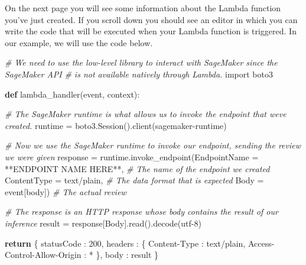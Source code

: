 \documentclass[11pt]{article}
\newenvironment{Shaded}{}{}
\newcommand{\KeywordTok}[1]{\textcolor[rgb]{0.00,0.44,0.13}{\textbf{{#1}}}}
\newcommand{\DecValTok}[1]{\textcolor[rgb]{0.25,0.63,0.44}{{#1}}}
\newcommand{\StringTok}[1]{\textcolor[rgb]{0.25,0.44,0.63}{{#1}}}
\newcommand{\CommentTok}[1]{\textcolor[rgb]{0.38,0.63,0.69}{\textit{{#1}}}}
\newcommand{\NormalTok}[1]{{#1}}
\newcommand{\ImportTok}[1]{{#1}}
\newcommand{\ControlFlowTok}[1]{\textcolor[rgb]{0.00,0.44,0.13}{\textbf{{#1}}}}
\newcommand{\OperatorTok}[1]{\textcolor[rgb]{0.40,0.40,0.40}{{#1}}}
\begin{document}
On the next page you will see some information about the Lambda function
you've just created. If you scroll down you should see an editor in
which you can write the code that will be executed when your Lambda
function is triggered. In our example, we will use the code below.

\begin{Shaded}
\begin{Highlighting}[]
\CommentTok{\# We need to use the low{-}level library to interact with SageMaker since the SageMaker API}
\CommentTok{\# is not available natively through Lambda.}
\ImportTok{import}\NormalTok{ boto3}

\KeywordTok{def}\NormalTok{ lambda\_handler(event, context):}

    \CommentTok{\# The SageMaker runtime is what allows us to invoke the endpoint that we\textquotesingle{}ve created.}
\NormalTok{    runtime }\OperatorTok{=}\NormalTok{ boto3.Session().client(}\StringTok{\textquotesingle{}sagemaker{-}runtime\textquotesingle{}}\NormalTok{)}

    \CommentTok{\# Now we use the SageMaker runtime to invoke our endpoint, sending the review we were given}
\NormalTok{    response }\OperatorTok{=}\NormalTok{ runtime.invoke\_endpoint(EndpointName }\OperatorTok{=} \StringTok{\textquotesingle{}**ENDPOINT NAME HERE**\textquotesingle{}}\NormalTok{,    }\CommentTok{\# The name of the endpoint we created}
\NormalTok{                                       ContentType }\OperatorTok{=} \StringTok{\textquotesingle{}text/plain\textquotesingle{}}\NormalTok{,                 }\CommentTok{\# The data format that is expected}
\NormalTok{                                       Body }\OperatorTok{=}\NormalTok{ event[}\StringTok{\textquotesingle{}body\textquotesingle{}}\NormalTok{])                       }\CommentTok{\# The actual review}

    \CommentTok{\# The response is an HTTP response whose body contains the result of our inference}
\NormalTok{    result }\OperatorTok{=}\NormalTok{ response[}\StringTok{\textquotesingle{}Body\textquotesingle{}}\NormalTok{].read().decode(}\StringTok{\textquotesingle{}utf{-}8\textquotesingle{}}\NormalTok{)}

    \ControlFlowTok{return}\NormalTok{ \{}
        \StringTok{\textquotesingle{}statusCode\textquotesingle{}}\NormalTok{ : }\DecValTok{200}\NormalTok{,}
        \StringTok{\textquotesingle{}headers\textquotesingle{}}\NormalTok{ : \{ }\StringTok{\textquotesingle{}Content{-}Type\textquotesingle{}}\NormalTok{ : }\StringTok{\textquotesingle{}text/plain\textquotesingle{}}\NormalTok{, }\StringTok{\textquotesingle{}Access{-}Control{-}Allow{-}Origin\textquotesingle{}}\NormalTok{ : }\StringTok{\textquotesingle{}*\textquotesingle{}}\NormalTok{ \},}
        \StringTok{\textquotesingle{}body\textquotesingle{}}\NormalTok{ : result}
\NormalTok{    \}}
\end{Highlighting}
\end{Shaded}
\end{document}
